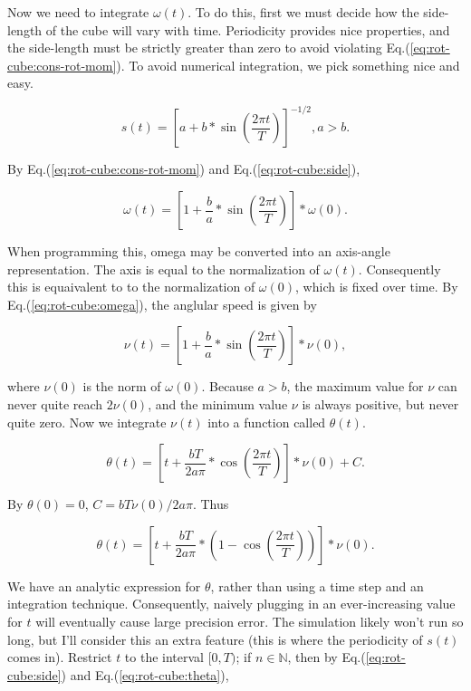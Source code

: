 \documentclass[a4paper,12pt]{book}
\begin{document}
Now we need to integrate $\omega(t)$. To do this, first we must decide how the side-length of the cube will vary with time. Periodicity provides nice properties, and the side-length must be strictly greater than zero to avoid violating Eq.(\ref{eq:rot-cube:cons-rot-mom}). To avoid numerical integration, we pick something nice and easy.

\begin{equation}\label{eq:rot-cube:side}
s(t) = \left[ a + b * \sin\left(\frac{2 \pi t}{T}\right) \right]^{-1/2}, a > b.
\end{equation}

By Eq.(\ref{eq:rot-cube:cons-rot-mom}) and Eq.(\ref{eq:rot-cube:side}),

\begin{equation}\label{eq:rot-cube:omega}
\omega(t) = \left[ 1 + \frac{b}{a} * \sin\left(\frac{2 \pi t}{T}\right) \right] * \omega(0).
\end{equation}

When programming this, omega may be converted into an axis-angle representation. The axis is equal to the normalization of $\omega(t)$. Consequently this is equaivalent to to the normalization of $\omega(0)$, which is fixed over time. By Eq.(\ref{eq:rot-cube:omega}), the anglular speed is given by

\begin{equation}\label{eq:rot-cub:nu}
\nu(t) = \left[ 1 + \frac{b}{a} * \sin\left(\frac{2 \pi t}{T}\right) \right] * \nu(0),
\end{equation}

where $\nu(0)$ is the norm of $\omega(0)$. Because $a > b$, the maximum value for $\nu$ can never quite reach $2 \nu(0)$, and the minimum value $\nu$ is always positive, but never quite zero. Now we integrate $\nu(t)$ into a function called $\theta(t)$.

\begin{equation*}
\theta(t) = \left[t + \frac{b T}{2 a \pi} * \cos\left(\frac{2 \pi t}{T}\right) \right] * \nu(0) + C.
\end{equation*}

By $\theta(0)= 0$, $C = b T \nu(0) / 2 a \pi$. Thus

\begin{equation}\label{eq:rot-cube:theta}
\theta(t) = \left[t + \frac{b T}{2 a \pi} * \left( 1 - \cos\left(\frac{2 \pi t}{T}\right) \right) \right] * \nu(0).
\end{equation}

We have an analytic expression for $\theta$, rather than using a time step and an integration technique. Consequently, naively plugging in an ever-increasing value for $t$ will eventually cause large precision error. 
The simulation likely won't run so long, but I'll consider this an extra feature (this is where the periodicity of $s(t)$ comes in). Restrict $t$ to the interval $[0,T)$; if $n \in \mathbb{N}$, then by Eq.(\ref{eq:rot-cube:side}) and Eq.(\ref{eq:rot-cube:theta}),
\end{document}
